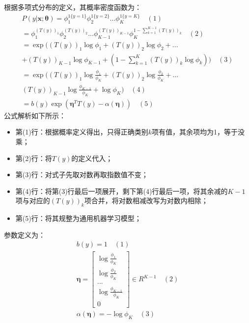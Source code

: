 \documentclass[UTF8]{article}
\begin{document}
根据多项式分布的定义，其概率密度函数为：
\begin{equation}
\begin{aligned}
P(y \vert \boldsymbol{x}; \boldsymbol{\theta}) = \phi _{1}^{1\{y=1\}} \phi _{2}^{1\{y=2\}} ... \phi _{K}^{1\{y=K\}} \quad (1) \\
= \phi _{1}^{(T(y))_{1}}\phi _{2}^{(T(y))_{2}}...\phi _{K-1}^{(T(y))_{K-1}}\phi _{K}^{1 - \sum_{k=1}^{K-1}(T(y))_{k}} \quad (2) \\
= \exp \Big( (T(y))_{1} \log \phi _{1} + (T(y))_{2} \log \phi _{2} + ... \\
+ (T(y))_{K-1} \log \phi _{K-1} + (1-\sum_{k=1}^{K} (T(y))_{k} \log \phi _{k} ) \Big) \quad (3) \\
= \exp \Big( (T(y))_{1} \log \frac{\phi _{1}}{\phi _{K}} + (T(y))_{2} \log \frac{\phi _{2}}{\phi _{K}} + ... \\
(T(y))_{K-1} \log \frac{\phi _{K-1}}{\phi _{K}} + \log \phi _{K} \Big) \quad (4) \\
= b(y) \exp (\boldsymbol{\eta}^{T}T(y) - \alpha(\boldsymbol{\eta})) \quad (5)
\end{aligned}
\label{lcrn-multi-class-indicator-function-ty-pp}
\end{equation}
公式解析如下所示：
\begin{itemize}
\item 第(1)行：根据概率定义得出，只得正确类别$k$项有值，其余项均为1，等于没乘；
\item 第(2)行：将$T(y)$的定义代入；
\item 第(3)行：对式子先取对数再取指数值不变；
\item 第(4)行：将第(3)行最后一项展开，剩下第(4)行最后一项，将其余减的$K-1$项与对应的$(T(y))_{k}$项合并，将对数相减改写为对数内相除；
\item 第(5)行：将其规整为通用机器学习模型；
\end{itemize}
参数定义为：
\begin{equation}
\begin{aligned}
b(y) = 1 \quad (1) \\
\boldsymbol{\eta} = \begin{bmatrix}
\log \frac{\phi _{1}}{\phi _{K}} \\
\log \frac{\phi _{2}}{\phi _{K}} \\
... \\
\log \frac{\phi _{K-1}}{\phi _{K}} \\
0
\end{bmatrix} \in R^{K-1} \quad (2) \\
\alpha(\boldsymbol{\eta}) = - \log \phi _{K} \quad (3)
\end{aligned}
\label{lcrn-gml-softmax-regression-params}
\end{equation}
\end{document}
